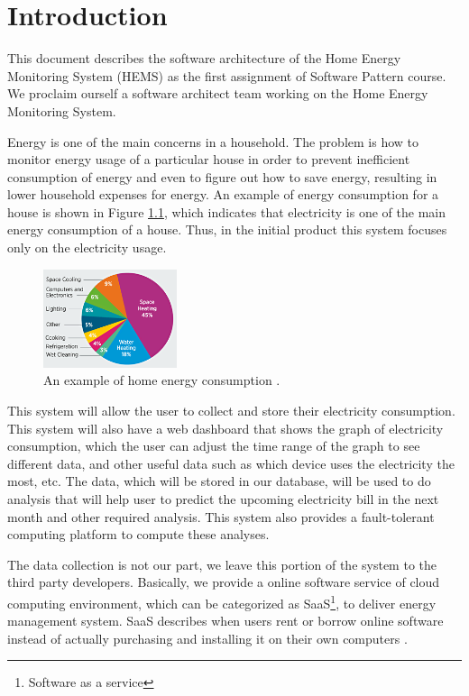 \chapter{Introduction}
\label{ch:context}
This document describes the software architecture of the Home Energy Monitoring System (HEMS) as the first assignment of Software Pattern course. We proclaim ourself a software architect team working on the Home Energy Monitoring System.

Energy is one of the main concerns in a household. The problem is how to monitor energy usage of a particular house in order to prevent inefficient consumption of energy and even to figure out how to save energy, resulting in lower household expenses for energy. An example of energy consumption for a house is shown in Figure \ref{fig:home-energy-consumption}, which indicates that electricity is one of the main energy consumption of a house. Thus, in the initial product this system focuses only on the electricity usage.

\begin{figure}[!ht]
	\centering
	\includegraphics[width=0.35\textwidth]{1-context/images/energysaver_energyuse.png}
	\caption{An example of home energy consumption \cite{greenifynow}.}
	\label{fig:home-energy-consumption}
\end{figure}

This system will allow the user to collect and store their electricity consumption. This system will also have a web dashboard that shows the graph of electricity consumption, which the user can adjust the time range of the graph to see different data, and other useful data such as which device uses the electricity the most, etc. The data, which will be stored in our database, will be used to do analysis that will help user to predict the upcoming electricity bill in the next month and other required analysis. This system also provides a fault-tolerant computing platform to compute these analyses.

The data collection is not our part, we leave this portion of the system to the third party developers. Basically, we provide a online software service of cloud computing environment, which can be categorized as SaaS\footnote{Software as a service}, to deliver energy management system. SaaS describes when users rent or borrow online software instead of actually purchasing and installing it on their own computers \cite{whatissaas}.

